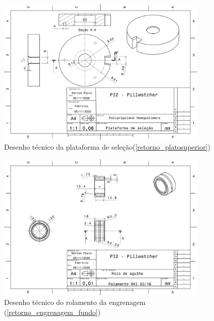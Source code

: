 \begin{apendicesenv}
\begin{figure}[H]
    \centering
    \includegraphics[width=0.9\textwidth]{figuras/estrutura/Desenhos/Plataforma_de_Selecao.pdf}
    \caption{Desenho técnico da plataforma de seleção(\ref{retorno_platosuperior})}
    \label{fig:platosuperior}
\end{figure}

\begin{figure}[H]
    \centering
    \includegraphics[width=0.9\textwidth]{figuras/estrutura/Desenhos/Rolamento_engrenagem.pdf}
    \caption{Desenho técnico do rolamento da engrenagem (\ref{retorno_engrenagem_fundo})}
    \label{fig:rolamento_engrenagem}
\end{figure}


\end{apendicesenv}
